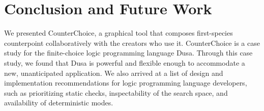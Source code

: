 \section{Conclusion and Future Work}
\label{sec:conclusion}
We presented CounterChoice, a graphical tool that composes first-species counterpoint collaboratively with the creators who use it.
CounterChoice is a case study for the finite-choice logic programming language Dusa. 
Through this case study, we found that Dusa is powerful and flexible enough to accommodate a new, unanticipated application.
We also arrived at a list of design and implementation recommendations for logic programming language developers, such as prioritizing static checks, inspectability of the search space, and availability of deterministic modes.

% 

